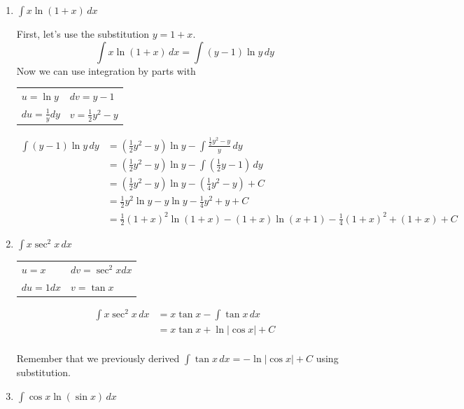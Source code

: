 \documentclass{article}
\begin{document}
\begin{enumerate}
\item $\displaystyle \int x\ln(1+x)\,dx$

\begin{solution}
First, let's use the substitution $y=1+x$.
\[
    \int x\ln(1+x)\,dx 
    = \int (y-1)\ln y\, dy
\]
    Now we can use integration by parts with
\begin{center}
\begin{tabular}{ l l }
  $u=\ln y$ &  $dv = y-1$ \\
  $du=\frac{1}{y}dy$ &  $v=\frac{1}{2}y^2-y$  \\
\end{tabular}
\begin{align*}
   \int (y-1)\ln y\, dy
    &= (\tfrac{1}{2}y^2-y)\ln y
        - \int \frac{\frac{1}{2}y^2-y}{y}\, dy\\
    &= (\tfrac{1}{2}y^2-y)\ln y - \int (\tfrac{1}{2}y-1)\,dy\\
    &= (\tfrac{1}{2}y^2-y)\ln y
        - (\tfrac{1}{4}y^2 - y) +C\\
    &= \tfrac{1}{2}y^2 \ln y - y \ln y - \tfrac{1}{4} y^2 + y + C \\
    &= \frac{1}{2}(1+x)^2\ln(1+x) - (1+x)\ln (x+1) - \frac{1}{4}(1+x)^2 + (1+x) +C
\end{align*}
\end{center}
\end{solution}
\pspace{\vfill}

\item $\displaystyle \int x\sec^2 x\,dx$

\begin{solution}
\begin{center}
    \begin{tabular}{ l l }
  $u=x$ &  $dv = \sec^2 x dx$  \\
  $du=1dx$ &  $v=
  \tan x$  \\
\end{tabular}
\begin{align*}
    \int x\sec^2 x\,dx &= x\tan x - \int \tan x\,dx \\
    &= x\tan x + \ln|\cos x| + C \\
\end{align*}
\end{center}\vspace{-24pt}
Remember that we previously derived $\int \tan x \,dx = -\ln|\cos x| +C$ using substitution.
\end{solution}
\pspace{\vfill}
\pspace{\newpage}
\item $\displaystyle \int \cos x \ln(\sin x)\,dx$


\end{enumerate}
\end{document}
